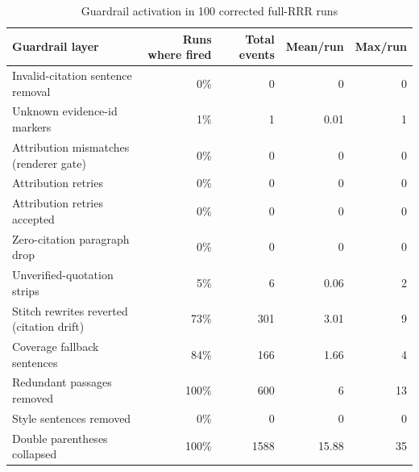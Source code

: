 \begin{table}[ht]
\centering
\caption{Guardrail activation in 100 corrected full-RRR runs}
\scriptsize
\begin{tabular}{lrrrr}
\toprule
Guardrail layer & Runs where fired & Total events & Mean/run & Max/run \\
\midrule
Invalid-citation sentence removal & 0\% & 0 & 0 & 0 \\
Unknown evidence-id markers & 1\% & 1 & 0.01 & 1 \\
Attribution mismatches (renderer gate) & 0\% & 0 & 0 & 0 \\
Attribution retries & 0\% & 0 & 0 & 0 \\
Attribution retries accepted & 0\% & 0 & 0 & 0 \\
Zero-citation paragraph drop & 0\% & 0 & 0 & 0 \\
Unverified-quotation strips & 5\% & 6 & 0.06 & 2 \\
Stitch rewrites reverted (citation drift) & 73\% & 301 & 3.01 & 9 \\
Coverage fallback sentences & 84\% & 166 & 1.66 & 4 \\
Redundant passages removed & 100\% & 600 & 6 & 13 \\
Style sentences removed & 0\% & 0 & 0 & 0 \\
Double parentheses collapsed & 100\% & 1588 & 15.88 & 35 \\
\bottomrule
\end{tabular}
\end{table}
